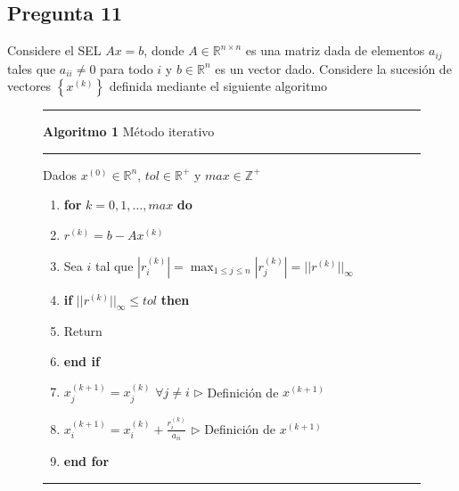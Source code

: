 \documentclass{article}
\def\R{\mbox{\(\mathbb{R}\)}}
\begin{document}
\subsection*{Pregunta 11}
Considere el SEL $Ax=b$, donde $A \in \mathbb{R}^{n\times n}$ es una matriz dada de elementos $a_{ij}$ tales que $a_{ii} \neq 0$ para todo $i$ y $b\in \R^{n}$ es un vector dado. Considere la sucesión de vectores $\left\lbrace x^{(k)}\right\rbrace$ definida mediante el siguiente algoritmo\\
\begin{figure}[h!]
\hrule
\vspace{1mm}
{\bf Algoritmo 1 }Método iterativo
\hrule
\vspace{1mm}
Dados $x^{(0)}\in \R^{n}$, $tol \in \R^+$ y $max \in \mathbb{Z}^+$
\begin{enumerate}[1:]
\item {\bf for} $k=0,1,\dots,max$ {\bf do}
\item \hspace{5mm} $r^{(k)}=b-Ax^{(k)}$
\item \hspace{5mm} Sea $i$ tal que $|r_{i}^{(k)}|=\max_{1\leq j \leq n}|r_{j}^{(k)}|=||r^{(k)}||_{\infty}$
\item \hspace{5mm} {\bf if} $||r^{(k)}||_{\infty}\leq tol$ {\bf then}
\item \hspace{10mm} Return
\item \hspace{5mm} {\bf end if}
\item \hspace{5mm} $x_{j}^{(k+1)}=x_{j}^{(k)}$\hspace{2mm}  $\forall j\neq i$\hspace{20mm} $\triangleright$ Definición de $x^{(k+1)}$
\item \hspace{5mm} $x_{i}^{(k+1)} = x_{i}^{(k)}+\frac{r_{i}^{(k)}}{a_{ii}}$\hspace{22.5mm} $\triangleright$ Definición de $x^{(k+1)}$
\item {\bf end for}
\end{enumerate}
\vspace{1mm}
\hrule
\end{figure}
\end{document}
